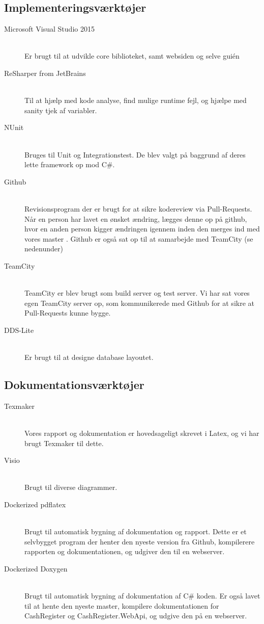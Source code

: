 \subsection{Implementeringsværktøjer}
\begin{description}
  \item[Microsoft Visual Studio 2015] \hfill \\
  Er brugt til at udvikle core biblioteket, samt websiden og selve gui\'en
  \item[ReSharper from JetBrains] \hfill \\
  Til at hjælp med kode analyse, find mulige runtime fejl, og hjælpe med sanity tjek af variabler.
  \item[NUnit] \hfill \\
  Bruges til Unit og Integrationstest. De blev valgt på baggrund af deres lette framework op mod C\#.
  \item[Github] \hfill \\
  Revisionsprogram der er brugt for at sikre kodereview via Pull-Requests. Når en person har lavet en ønsket ændring, lægges denne op på github, hvor en anden person kigger ændringen igennem inden den merges ind med vores master \citeauthor{gh:pullrequests}. Github er også sat op til at samarbejde med TeamCity (se nedenunder)
  \item[TeamCity] \hfill \\
  TeamCity er blev brugt som build server og test server. Vi har sat vores egen TeamCity server op, som kommunikerede med Github for at sikre at Pull-Requests kunne bygge.
  \item[DDS-Lite] \hfill \\
  Er brugt til at designe database layoutet.
\end{description}

\subsection{Dokumentationsværktøjer}
\begin{description}
  \item[Texmaker] \hfill \\
  Vores rapport og dokumentation er hovedsageligt skrevet i Latex, og vi har brugt Texmaker til dette.
  \item[Visio] \hfill \\
  Brugt til diverse diagrammer.
  \item[Dockerized pdflatex] \hfill \\
  Brugt til automatisk bygning af dokumentation og rapport. Dette er et selvbygget program der henter den nyeste version fra Github, kompilerere rapporten og dokumentationen, og udgiver den til en webserver.
  \item[Dockerized Doxygen] \hfill \\
  Brugt til automatisk bygning af dokumentation af C\# koden. Er også lavet til at hente den nyeste master, kompilere dokumentationen for CashRegister og CashRegister.WebApi, og udgive den på en webserver.
\end{description}


